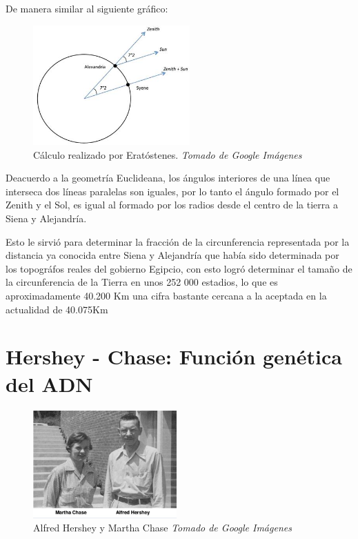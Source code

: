 \documentclass[journal]{IEEEtran}
\begin{document}
De manera similar al siguiente gráfico:
\begin{center}
  \begin{figure}[h!]
  \includegraphics[width=60mm]{Eratostenes.jpg}
  \caption{Cálculo realizado por Eratóstenes. \emph{Tomado de Google Imágenes}}
  \end{figure}
\end{center}

Deacuerdo a la geometría Euclideana, los ángulos interiores
de una línea que interseca dos líneas paralelas son iguales, por lo tanto el ángulo formado por el Zenith y el Sol, es igual al formado
por los radios desde el centro de la tierra a Siena y Alejandría.

Esto le sirvió para determinar la fracción de la circunferencia representada por la distancia ya conocida entre Siena y Alejandría que había sido 
determinada por los topográfos reales del gobierno Egipcio, con esto logró determinar el tamaño de la circunferencia 
de la Tierra en unos 252 000 estadios, lo que es aproximadamente 40.200 Km una cifra bastante cercana a la aceptada en la actualidad de 40.075Km \cite{crease_2014}

\section{Hershey - Chase: Función genética del ADN}
\begin{center}
  \begin{figure}[h!]
  \includegraphics[width=55mm]{hersheyChase.jpg}
  \caption{Alfred Hershey y Martha Chase \emph{Tomado de Google Imágenes}}
  \end{figure}
\end{center}
\end{document}
